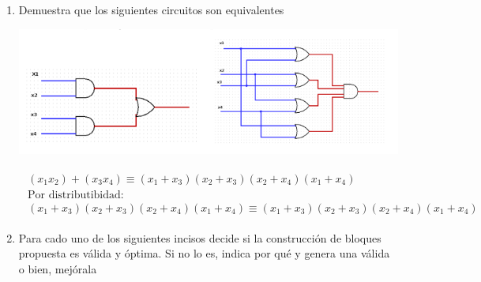 \documentclass[11pt,letterpaper]{article}
\begin{document}
\begin{enumerate}
    \item Demuestra que los siguientes circuitos son equivalentes
        \begin{center}
            \includegraphics[scale=.5]{./assets/1.png}
        \end{center}

        \begin{equation*} \begin{split} \begin{gathered}
            (x_1 x_2) + (x_3 x_4) \equiv (x_1 + x_3) (x_2 + x_3) (x_2 + x_4) (x_1 + x_4) \\
            \text{Por distributibidad:} \\
            (x_1 + x_3) (x_2 + x_3) (x_2 + x_4) (x_1 + x_4) \equiv (x_1 + x_3) (x_2 + x_3) (x_2 + x_4) (x_1 + x_4)
        \end{gathered} \end{split} \end{equation*}

    \item Para cado uno de los siguientes incisos decide si la construcción de bloques
    propuesta es válida y óptima. Si no lo es, indica por qué y genera una válida o bien, mejórala
        \begin{enumerate}
\end{enumerate}
\end{enumerate}
\end{document}
